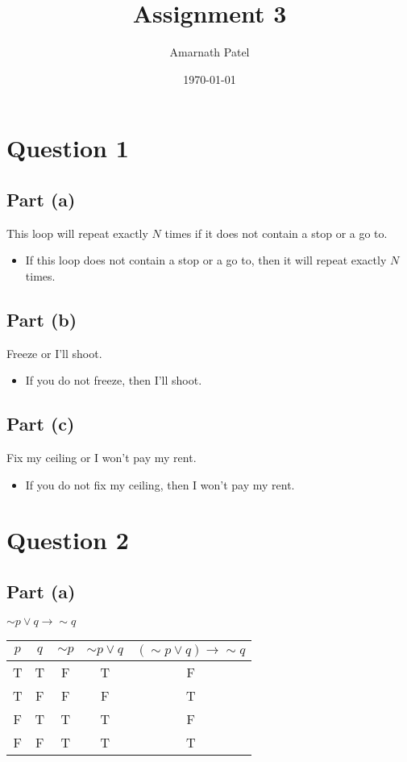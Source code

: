 \documentclass{article}
\title{Assignment 3}
\author{Amarnath Patel}
\date{\today}
\begin{document}
\maketitle

\section{Question 1}
\subsection{Part (a)}
This loop will repeat exactly $N$ times if it does not contain a stop or a go to.
\begin{itemize}
    \item If this loop does not contain a stop or a go to, then it will repeat exactly $N$ times.
\end{itemize}

\subsection{Part (b)}
Freeze or I’ll shoot.
\begin{itemize}
    \item If you do not freeze, then I’ll shoot.
\end{itemize}

\subsection{Part (c)}
Fix my ceiling or I won’t pay my rent.
\begin{itemize}
    \item If you do not fix my ceiling, then I won’t pay my rent.
\end{itemize}

\section{Question 2}
\subsection{Part (a)}
$\sim p \lor q \to \sim q$
\begin{tabular}{|c|c|c|c|c|}
    \hline
    $p$ & $q$ & $\sim p$ & $\sim p \lor q$ & $(\sim p \lor q) \to \sim q$ \\
    \hline
    T & T & F & T & F \\
    T & F & F & F & T \\
    F & T & T & T & F \\
    F & F & T & T & T \\
    \hline
\end{tabular}
\end{document}
